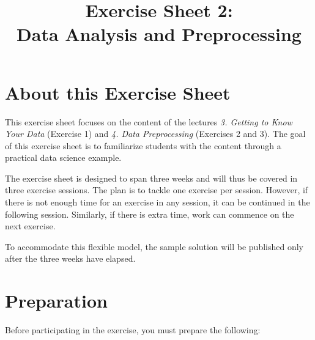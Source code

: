 \documentclass[
english,
smallborders
]{i6prcsht}
\begin{document}
\title{Exercise Sheet 2: \\ Data Analysis and Preprocessing}
\maketitle
\vspace*{-2cm}

\section*{About this Exercise Sheet}

This exercise sheet focuses on the content of the lectures \textit{3. Getting to Know Your Data} (Exercise 1) and \textit{4. Data Preprocessing} (Exercises 2 and 3). The goal of this exercise sheet is to familiarize students with the content through a practical data science example.

The exercise sheet is designed to span three weeks and will thus be covered in three exercise sessions. The plan is to tackle one exercise per session. However, if there is not enough time for an exercise in any session, it can be continued in the following session. Similarly, if there is extra time, work can commence on the next exercise.

To accommodate this flexible model, the sample solution will be published only after the three weeks have elapsed.

\section*{Preparation}

Before participating in the exercise, you must prepare the following:
\end{document}
